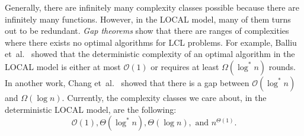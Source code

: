 Generally, there are infinitely many complexity classes possible because there are infinitely many functions.
However, in the LOCAL model, many of them turns out to be redundant.
\emph{Gap theorems} show that there are ranges of complexities where there exists no optimal algorithms for LCL problems.
For example, Balliu et~al.~\cite{DBLP:conf/podc/BalliuHOS19} showed that the deterministic complexity of an optimal algorithm in the LOCAL model is either at most \(\mathcal{O}(1)\) or requires at least \(\Omega(\log^* n)\) rounds.
In another work, Chang et~al.~\cite{DBLP:conf/focs/ChangKP16} showed that there is a gap between \(\mathcal{O}(\log^* n)\) and \(\Omega(\log n)\).
Currently, the complexity classes we care about, in the deterministic LOCAL model, are the following:
\[\mathcal{O}(1), \Theta(\log^* n), \Theta(\log n), \text{ and } n^{\Theta(1)}.\]


